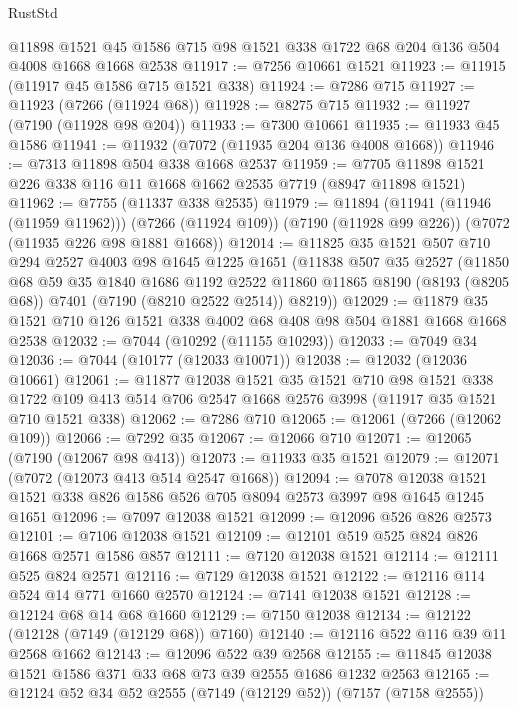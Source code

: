 \begin{lexlean}{RustStd}
\begin{coremodule}
    @11898
    @1521
    @45
    @1586
    @715
    @98
    @1521
    @338
    @1722
    @68
    @204
    @136
    @504
    @4008
    @1668
    @1668
    @2538
@11917 := @7256 @10661 @1521
@11923 := @11915 (@11917 @45 @1586 @715 @1521 @338)
@11924 := @7286 @715
@11927 := @11923 (@7266 (@11924 @68))
@11928 := @8275 @715
@11932 := @11927 (@7190 (@11928 @98 @204))
@11933 := @7300 @10661
@11935 := @11933 @45 @1586
@11941 := @11932 (@7072 (@11935 @204 @136 @4008 @1668))
@11946 := @7313 @11898 @504 @338 @1668 @2537
@11959 := @7705 @11898 @1521 @226 @338 @116 @11 @1668 @1662 @2535 @7719 (@8947 @11898 @1521)
@11962 := @7755 (@11337 @338 @2535)
@11979 := @11894
    (@11941 (@11946 (@11959 @11962)))
    (@7266 (@11924 @109))
    (@7190 (@11928 @99 @226))
    (@7072 (@11935 @226 @98 @1881 @1668))
@12014 := @11825
    @35
    @1521
    @507
    @710
    @294
    @2527
    @4003
    @98
    @1645
    @1225
    @1651
    (@11838
      @507
      @35
      @2527
      (@11850
        @68
        @59
        @35
        @1840
        @1686
        @1192
        @2522
        @11860
        @11865
        @8190
        (@8193 (@8205 @68))
        @7401
        (@7190 (@8210 @2522 @2514))
        @8219))
@12029 := @11879 @35 @1521 @710 @126 @1521 @338 @4002 @68 @408 @98 @504 @1881 @1668 @1668 @2538
@12032 := @7044 (@10292 (@11155 @10293))
@12033 := @7049 @34
@12036 := @7044 (@10177 (@12033 @10071))
@12038 := @12032 (@12036 @10661)
@12061 := @11877
    @12038
    @1521
    @35
    @1521
    @710
    @98
    @1521
    @338
    @1722
    @109
    @413
    @514
    @706
    @2547
    @1668
    @2576
    @3998
    (@11917 @35 @1521 @710 @1521 @338)
@12062 := @7286 @710
@12065 := @12061 (@7266 (@12062 @109))
@12066 := @7292 @35
@12067 := @12066 @710
@12071 := @12065 (@7190 (@12067 @98 @413))
@12073 := @11933 @35 @1521
@12079 := @12071 (@7072 (@12073 @413 @514 @2547 @1668))
@12094 := @7078 @12038 @1521 @1521 @338 @826 @1586 @526 @705 @8094 @2573 @3997 @98 @1645 @1245 @1651
@12096 := @7097 @12038 @1521
@12099 := @12096 @526 @826 @2573
@12101 := @7106 @12038 @1521
@12109 := @12101 @519 @525 @824 @826 @1668 @2571 @1586 @857
@12111 := @7120 @12038 @1521
@12114 := @12111 @525 @824 @2571
@12116 := @7129 @12038 @1521
@12122 := @12116 @114 @524 @14 @771 @1660 @2570
@12124 := @7141 @12038 @1521
@12128 := @12124 @68 @14 @68 @1660
@12129 := @7150 @12038
@12134 := @12122 (@12128 (@7149 (@12129 @68)) @7160)
@12140 := @12116 @522 @116 @39 @11 @2568 @1662
@12143 := @12096 @522 @39 @2568
@12155 := @11845 @12038 @1521 @1586 @371 @33 @68 @73 @39 @2555 @1686 @1232 @2563
@12165 := @12124 @52 @34 @52 @2555 (@7149 (@12129 @52)) (@7157 (@7158 @2555))

\end{coremodule}
\end{lexlean}
